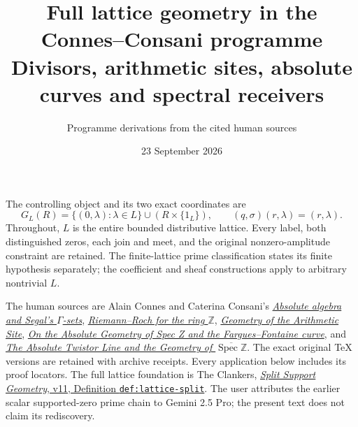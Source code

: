 \documentclass[11pt]{article}
\title{Full lattice geometry in the Connes--Consani programme\\
Divisors, arithmetic sites, absolute curves and spectral receivers}
\author{Programme derivations from the cited human sources}
\date{23 September 2026}
\theoremstyle{definition}
\begin{document}
\maketitle
The controlling object and its two exact coordinates are
\[
G_L(R)=\{(0,\lambda):\lambda\in L\}\cup(R\times\{1_L\}),
\qquad(q,\sigma)(r,\lambda)=(r,\lambda).
\]
Throughout, $L$ is the entire bounded distributive lattice. Every
label, both distinguished zeros, each join and meet, and the original
nonzero-amplitude constraint are retained. The finite-lattice prime
classification states its finite hypothesis separately; the coefficient
and sheaf constructions apply to arbitrary nontrivial $L$.

The human sources are Alain Connes and Caterina Consani's
\href{https://arxiv.org/abs/1502.05585v2}{\emph{Absolute algebra and
Segal's $\Gamma$-sets}},
\href{https://arxiv.org/abs/2306.00456v1}{\emph{Riemann--Roch for the ring
$\mathbb Z$}},
\href{https://arxiv.org/abs/1502.05580v1}{\emph{Geometry of the Arithmetic Site}},
\href{https://arxiv.org/abs/2606.06604v1}{\emph{On the Absolute Geometry of
Spec Z and the Fargues--Fontaine curve}}, and
\href{https://arxiv.org/abs/2609.00299v1}{\emph{The Absolute Twistor Line and
the Geometry of $\overline{\operatorname{Spec}\mathbb Z}$}}.
The exact original TeX versions are retained with archive receipts.
Every application below includes its proof locators. The full lattice
foundation is The Clankers,
\href{https://github.com/KokunoYumeto/zeta-function-research-reader/blob/a2851f9eb352e7e4376bc629de86fa4ed9c1c434/workbenches/splitzero-tandem/foundations/split-support-geometry-v11/split_support_geometry_arithmetic_curve_v11.tex#L1226}{\emph{Split Support Geometry}, v11, Definition \texttt{def:lattice-split}}.
The user attributes the earlier scalar supported-zero prime chain to
Gemini 2.5 Pro; the present text does not claim its rediscovery.
\end{document}
